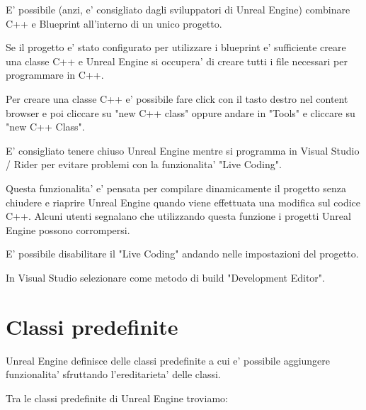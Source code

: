     \begin{notebox}
        E' possibile (anzi, e' consigliato dagli sviluppatori di Unreal Engine) combinare C++ e Blueprint all'interno di un unico progetto.

        Se il progetto e' stato configurato per utilizzare i blueprint e' sufficiente creare una classe C++ e Unreal Engine si occupera' di creare tutti i file necessari per programmare in C++.

        Per creare una classe C++ e' possibile fare click con il tasto destro nel content browser e poi cliccare su "new C++ class" oppure andare in "Tools" e cliccare su "new C++ Class".
    \end{notebox}

    E' consigliato tenere chiuso Unreal Engine mentre si programma in Visual Studio / Rider per evitare problemi con la funzionalita' "Live Coding".

    Questa funzionalita' e' pensata per compilare dinamicamente il progetto senza chiudere e riaprire Unreal Engine quando viene effettuata una modifica sul codice C++.
    Alcuni utenti segnalano che utilizzando questa funzione i progetti Unreal Engine possono corrompersi.

    \begin{suggestionbox}
        E' possibile disabilitare il "Live Coding" andando nelle impostazioni del progetto.
    \end{suggestionbox}

    In Visual Studio selezionare come metodo di build "Development Editor".


    \section{Classi predefinite}

        Unreal Engine definisce delle classi predefinite a cui e' possibile aggiungere funzionalita' sfruttando l'ereditarieta' delle classi.

        Tra le classi predefinite di Unreal Engine troviamo:

